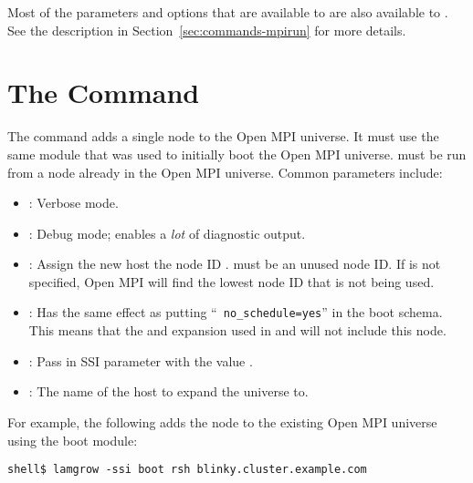 Most of the parameters and options that are available to 
are also available to .  See the  description
in Section~\ref{sec:commands-mpirun} for more details.


\section{The  Command}
\label{sec:commands-lamgrow}

The  command adds a single node to the Open MPI universe.  It
must use the same  module that was used to initially boot
the Open MPI universe.   must be run from a node already in
the Open MPI universe.  Common parameters include:

\begin{itemize}
\item {}: Verbose mode.
  
\item {}: Debug mode; enables a {\em lot} of diagnostic
  output.

\item {}: Assign the new host the node ID
  .    must be an unused node ID.  If
   is not specified, Open MPI will find the lowest node ID that
  is not being used.
  
\item {}: Has the same effect as putting ``{\tt
    no\_\-schedule=yes}'' in the boot schema.  This means that the
   and  expansion used in  and 
  will not include this node.

\item {}: Pass in SSI parameter
   with the value .

\item {}: The name of the host to expand the
  universe to.
\end{itemize}

For example, the following adds the node  to the existing
Open MPI universe using the  boot module:

\lstset{style=lam-cmdline}
\begin{lstlisting}
shell$ lamgrow -ssi boot rsh blinky.cluster.example.com
\end{lstlisting}

